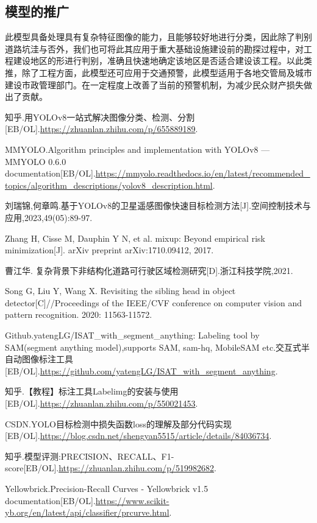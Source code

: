 \documentclass{MathorCupmodeling}
\begin{document}
	\subsection{模型的推广}
	此模型具备处理具有复杂特征图像的能力，且能够较好地进行分类，因此除了判别道路坑洼与否外，我们也可将此其应用于重大基础设施建设前的勘探过程中，对工程建设地区的形进行判别，准确且快速地确定该地区是否适合建设该工程。以此类推，除了工程方面，此模型还可应用于交通预警，此模型适用于各地交管局及城市建设市政管理部门。在一定程度上改善了当前的预警机制，为减少民众财产损失做出了贡献。
	\newpage
	
	\begin{spacing}{1.08}
	\begin{thebibliography}{99}
	知乎.用YOLOv8一站式解决图像分类、检测、分割[EB/OL].\url{https://zhuanlan.zhihu.com/p/655889189}.

	MMYOLO.Algorithm principles and implementation with YOLOv8 — MMYOLO 0.6.0 documentation[EB/OL].\url{https://mmyolo.readthedocs.io/en/latest/recommended_topics/algorithm_descriptions/yolov8_description.html}.

	刘瑞锦,何章鸣.基于YOLOv8的卫星遥感图像快速目标检测方法[J].空间控制技术与应用,2023,49(05):89-97.

	Zhang H, Cisse M, Dauphin Y N, et al. mixup: Beyond empirical risk minimization[J]. arXiv preprint arXiv:1710.09412, 2017.

	曹江华. 复杂背景下非结构化道路可行驶区域检测研究[D].浙江科技学院,2021.

	Song G, Liu Y, Wang X. Revisiting the sibling head in object detector[C]//Proceedings of the IEEE/CVF conference on computer vision and pattern recognition. 2020: 11563-11572.

	Github.yatengLG/ISAT\_with\_segment\_anything: Labeling tool by SAM(segment anything model),supports SAM, sam-hq, MobileSAM etc.交互式半自动图像标注工具[EB/OL].\url{https://github.com/yatengLG/ISAT_with_segment_anything}.

	知乎.【教程】标注工具Labelimg的安装与使用[EB/OL].\url{https://zhuanlan.zhihu.com/p/550021453}.

	CSDN.YOLO目标检测中损失函数loss的理解及部分代码实现[EB/OL].\url{https://blog.csdn.net/shengyan5515/article/details/84036734}.

	知乎.模型评测:PRECISION、RECALL、F1-score[EB/OL].\url{https://zhuanlan.zhihu.com/p/519982682}.


	Yellowbrick.Precision-Recall Curves - Yellowbrick v1.5 documentation[EB/OL].\url{https://www.scikit-yb.org/en/latest/api/classifier/prcurve.html}.

	\end{thebibliography}
	\end{spacing}
	\newpage
\end{document}
